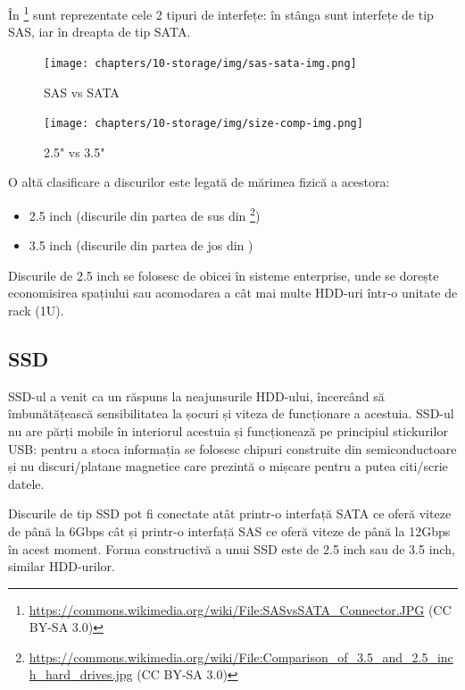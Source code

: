 În \footnote{\url{https://commons.wikimedia.org/wiki/File:SASvsSATA\_Connector.JPG} (CC BY-SA 3.0)} sunt reprezentate cele 2 tipuri
de interfețe: în stânga sunt interfețe de tip SAS, iar în dreapta de tip SATA.

\begin{figure}[!htbp]
  \centering
  \texttt{[image: chapters/10-storage/img/sas-sata-img.png]}
  \caption{SAS vs SATA}
  \label{fig:storage:sas-sata}
\end{figure}

\begin{figure}[!htbp]
  \centering
  \texttt{[image: chapters/10-storage/img/size-comp-img.png]}
  \caption{2.5" vs 3.5"}
  \label{fig:storage:size-comp}
\end{figure}

O altă clasificare a discurilor este legată de mărimea fizică a acestora:

\begin{itemize}
  \item 2.5 inch (discurile din partea de sus din \footnote{\url{https://commons.wikimedia.org/wiki/File:Comparison\_of\_3.5\_and\_2.5\_inch\_hard\_drives.jpg} (CC BY-SA 3.0)})
  \item 3.5 inch (discurile din partea de jos din )
\end{itemize}

Discurile de 2.5 inch se folosesc de obicei în sisteme enterprise, unde se
dorește economisirea spațiului sau acomodarea a cât mai multe HDD-uri într-o
unitate de rack (1U).

\subsection{SSD}
\label{sec:storage:type:ssd}

SSD-ul a venit ca un răspuns la neajunsurile HDD-ului, încercând să
îmbunătățească sensibilitatea la șocuri și viteza de funcționare a
acestuia. SSD-ul nu are părți mobile în interiorul acestuia și funcționează pe
principiul stickurilor USB: pentru a stoca informația se folosesc chipuri
construite din semiconductoare și nu discuri/platane magnetice care prezintă o
mișcare pentru a putea citi/scrie datele.

Discurile de tip SSD pot fi conectate atât printr-o interfață SATA ce oferă
viteze de până la 6Gbps cât și printr-o interfață SAS ce oferă viteze de până la
12Gbps în acest moment. Forma constructivă a unui SSD este de 2.5 inch sau
de 3.5 inch, similar HDD-urilor.

